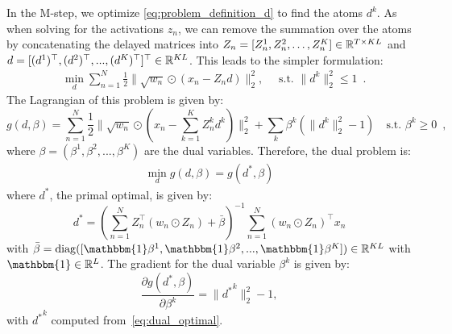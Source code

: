 \begin{appendices}
In the M-step, we optimize \eqref{eq:problem_definition_d} to find the atoms $d^k$.
As when solving for the activations $z_n$, we can remove the summation over the atoms by concatenating the delayed matrices into $Z_{n}=[Z_{n}^1, Z_{n}^2, \dots, Z_{n}^K] \in \mathbb{R}^{T \times KL}$ and $d=[(d^1)^\top, (d^2)^\top, ..., (d^K)^\top]^\top \in \mathbb{R}^{KL}$. This leads to the simpler formulation:
%
\begin{align}
& \min_{d} \sum_{n=1}^{N} \frac{1}{2}\|\sqrt{w_n} \odot (x_{n} - Z_{n}d)\|_{2}^{2}, \quad \text{  s.t.  } \|d^k\|_2^2 \leq 1 \enspace.
\label{eq:subproblem_d}
\end{align}
%
%
 The Lagrangian of this problem is given by:
%
\begin{equation}
g(d, \beta) = \sum_{n=1}^{N} \frac{1}{2}\|\sqrt{w_n} \odot (x_{n} - \sum_{k=1}^{K} Z_{n}^{k}d^{k}) \|_{2}^{2} + \sum_k \beta^k (\|d^k\|_2^{2} - 1) \quad \text{s.t. } \beta^k \geq 0 \enspace,
\end{equation}
%
where $\beta = (\beta^1, \beta^2, ..., \beta^K)$ are the dual variables. Therefore, the dual problem is:
%
\begin{align}
\min_{d}{g(d, \beta)} = g(d^{*}, \beta)
\end{align}
%
where $d^*$, the primal optimal, is given by:
%
\begin{equation}
d^{*} = (\sum_{n=1}^N Z_n^{\top}(w_{n} \odot Z_n) + \bar{\beta} )^{-1}\sum_{n=1}^{N}(w_{n} \odot Z_n)^{\top}x_n
\label{eq:dual_optimal}
\end{equation}
%
with $\bar{\beta} = \mathrm{diag}([\mathbbm{1}\beta^1, \mathbbm{1}\beta^2, ..., \mathbbm{1}\beta^K]) \in \bbR^{KL}$ with $\mathbbm{1} \in \bbR^{L}$. The gradient for the dual variable $\beta^k$ is given by:
%
\begin{equation}
\frac{\partial g(d^{*}, \beta)}{\partial \beta^k}  = \|{d^{*}}^k\|_2^2 - 1,
\end{equation}
%
with ${d^{*}}^k$ computed from~\eqref{eq:dual_optimal}.

\end{appendices}
